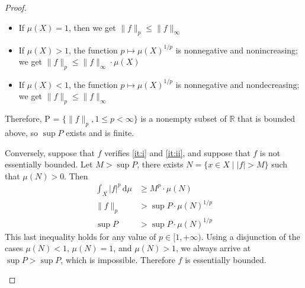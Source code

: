 \documentclass[11pt,a4paper,twoside]{article}
\theoremstyle{definition}
\begin{document}
\begin{proof}
\begin{enumerate}[(a)]
    \begin{itemize}

      \item If $\mu (X) = 1$, then we get $\| f \|_p \leq \| f \|_\infty$

      \item If $\mu (X) > 1$, the function $p \mapsto \mu (X)^{1 / p}$ is nonnegative and nonincreasing; we get $\| f \|_p \leq \| f \|_\infty \cdot \mu (X)$

      \item If $\mu (X) < 1$, the function $p \mapsto \mu (X)^{1 / p}$ is nonnegative and nondecreasing; we get $\| f \|_p \leq \| f \|_\infty$

    \end{itemize}

    Therefore, P = $\{ \| f \|_p, 1 \leq p < \infty \}$ is a nonempty subset of $\mathbb{R}$ that is bounded above,
    so $\sup P$ exists and is finite.

    Conversely, suppose that $f$ verifies \ref{it:i} and \ref{it:ii}, and suppose that $f$ is not essentially bounded.
    Let $M > \sup P$, there exists $N = \{ x \in X \mid | f | > M \}$ such that $\mu (N) > 0$. Then
    \begin{align*}
      \int_X | f |^p \,\mathrm{d}\mu &\geq M^p \cdot \mu (N) \\
      \| f \|_p &> \sup P \cdot \mu (N)^{1 / p} \\
      \sup P &> \sup P \cdot \mu (N)^{1 / p}
    \end{align*}
    This last inequality holds for any value of $p \in [1, +\infty)$. Using a disjunction of the cases $\mu (N) < 1$, $\mu (N) = 1$,
    and $\mu (N) > 1$, we always arrive at $\sup P > \sup P$, which is impossible. Therefore $f$ is essentially bounded.


\end{enumerate}
\end{proof}
\end{document}
